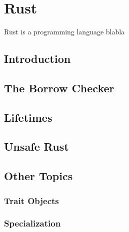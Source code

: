 \chapter{Rust}

Rust is a programming language blabla

\section{Introduction}

\section{The Borrow Checker}

\section{Lifetimes\label{sec:rust-lifetimes}}

\section{Unsafe Rust}

\section{Other Topics}

\subsection{Trait Objects\label{sec:trait-objects}}

\subsection{Specialization\label{sec:specialization}}
